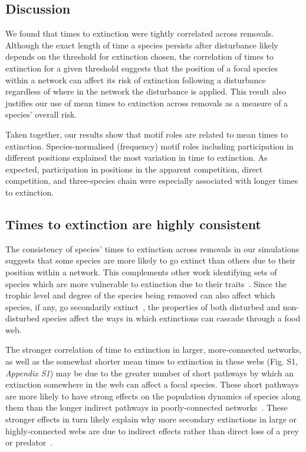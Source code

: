 \documentclass[12pt]{article}
\begin{document}
\begin{spacing}{2.0}
    
\section*{Discussion}

    We found that times to extinction were tightly correlated across removals. 
    Although the exact length of time a species persists after disturbance likely depends on the threshold for extinction chosen, the correlation of times to extinction for a given threshold suggests that the position of a focal species within a network can affect its risk of extinction following a disturbance regardless of where in the network the disturbance is applied. 
    This result also justifies our use of mean times to extinction across removals as a measure of a species' overall risk.
    
    
    Taken together, our results show that motif roles are related to mean times to extinction.
    Species-normalised (frequency) motif roles including participation in different positions explained the most variation in time to extinction.
    As expected, participation in positions in the apparent competition, direct competition, and three-species chain were especially associated with longer times to extinction.


 	\subsection*{Times to extinction are highly consistent}

		The consistency of species' times to extinction across removals in our simulations suggests that some species are more likely to go extinct than others due to their position within a network.
        This complements other work identifying sets of species which are more vulnerable to extinction due to their traits~\citep{Curtsdotter2011,Ryser2019}. 
		Since the trophic level and degree of the species being removed can also affect which species, if any, go secondarily extinct~\citep{Wootton2016a,Dunne2002}, the properties of both disturbed and non-disturbed species affect the ways in which extinctions can cascade through a food web.
		
		
		The stronger correlation of time to extinction in larger, more-connected networks, as well as the somewhat shorter mean times to extinction in these webs (Fig. S1, \emph{Appendix S1}) may be due to the greater number of short pathways by which an extinction somewhere in the web can affect a focal species. 
		These short pathways are more likely to have strong effects on the population dynamics of species along them than the longer indirect pathways in poorly-connected networks~\citep{Jordan2002,Jordan2006}.
		These stronger effects in turn likely explain why more secondary extinctions in large or highly-connected webs are due to indirect effects rather than direct loss of a prey or predator~\citep{Wootton2016a}. 



\end{spacing}
\end{document}
